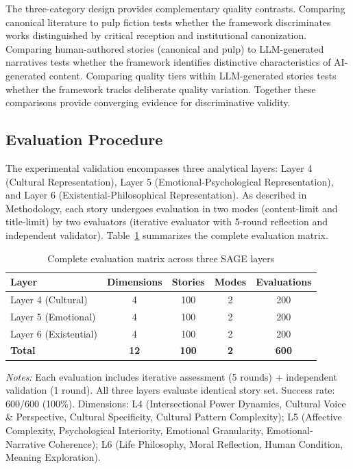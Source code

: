 The three-category design provides complementary quality contrasts. Comparing canonical literature to pulp fiction tests whether the framework discriminates works distinguished by critical reception and institutional canonization. Comparing human-authored stories (canonical and pulp) to LLM-generated narratives tests whether the framework identifies distinctive characteristics of AI-generated content. Comparing quality tiers within LLM-generated stories tests whether the framework tracks deliberate quality variation. Together these comparisons provide converging evidence for discriminative validity.

\subsection{Evaluation Procedure}

The experimental validation encompasses three analytical layers: Layer 4 (Cultural Representation), Layer 5 (Emotional-Psychological Representation), and Layer 6 (Existential-Philosophical Representation). As described in Methodology, each story undergoes evaluation in two modes (content-limit and title-limit) by two evaluators (iterative evaluator with 5-round reflection and independent validator). Table~\ref{tab:evaluation_matrix} summarizes the complete evaluation matrix.

\begin{table}[t]
\centering
\caption{Complete evaluation matrix across three SAGE layers}
\label{tab:evaluation_matrix}
\small
\begin{tabular}{lcccc}
\toprule
\textbf{Layer} & \textbf{Dimensions} & \textbf{Stories} & \textbf{Modes} & \textbf{Evaluations} \\
\midrule
Layer 4 (Cultural) & 4 & 100 & 2 & 200 \\
Layer 5 (Emotional) & 4 & 100 & 2 & 200 \\
Layer 6 (Existential) & 4 & 100 & 2 & 200 \\
\midrule
\textbf{Total} & \textbf{12} & \textbf{100} & \textbf{2} & \textbf{600} \\
\bottomrule
\end{tabular}
\vspace{0.1cm}

\small
\textit{Notes:} Each evaluation includes iterative assessment (5 rounds) + independent validation (1 round). All three layers evaluate identical story set. Success rate: 600/600 (100\%). Dimensions: L4 (Intersectional Power Dynamics, Cultural Voice \& Perspective, Cultural Specificity, Cultural Pattern Complexity); L5 (Affective Complexity, Psychological Interiority, Emotional Granularity, Emotional-Narrative Coherence); L6 (Life Philosophy, Moral Reflection, Human Condition, Meaning Exploration).
\end{table}

